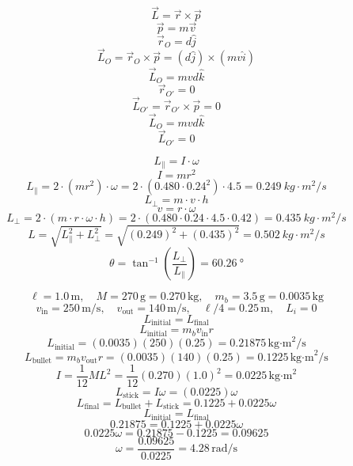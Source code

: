\documentclass[11pt]{homework}
\begin{document}
\setcounter{questionCounter}{35}
\question
\[
\vec{L} = \vec{r} \times \vec{p}
\]
\[
\vec{p} = m \vec{v}
\]
\[
\vec{r}_O = d \hat{j}
\]
\[
\vec{L}_O = \vec{r}_O \times \vec{p} = (d \hat{j}) \times (m v \hat{i})
\]
\[
\boxed{\vec{L}_O = m v d \hat{k}}
\]
\[
\vec{r}_{O'} = 0
\]
\[
\vec{L}_{O'} = \vec{r}_{O'} \times \vec{p} = 0
\]
\[
\vec{L}_O = m v d \hat{k}
\]
\[
    \boxed{\vec{L}_{O'} = 0}
\]


\setcounter{questionCounter}{41}
\question
\begin{alphaparts}
\questionpart

\[
L_{\parallel} = I \cdot \omega
\]
\[
I = m r^2
\]
\[
L_{\parallel} = 2 \cdot (m r^2) \cdot \omega = 2 \cdot (0.480 \cdot 0.24^2) \cdot 4.5 = \qty{0.249}{kg \cdot m^2 /s}
\]
\[
L_{\perp} = m \cdot v \cdot h
\]
\[
v = r \cdot \omega
\]
\[
    L_{\perp} = 2 \cdot (m \cdot r \cdot \omega \cdot h) = 2 \cdot (0.480 \cdot 0.24 \cdot 4.5 \cdot 0.42) = \qty{0.435}{kg \cdot m^2 /s}
\]
\[
    L = \sqrt{L_{\parallel}^2 + L_{\perp}^2} = \sqrt{(0.249)^2 + (0.435)^2} = \boxed{\qty{0.502}{kg \cdot m^2 /s}}
\]
\questionpart
\[
\theta = \tan^{-1} \left( \frac{L_{\perp}}{L_{\parallel}} \right) = \boxed{\qty{60.26}{\degree}}
\]
\end{alphaparts}


\setcounter{questionCounter}{47}
\question
\[\ell = 1.0 \, \text{m}, \quad
M = 270 \, \text{g} = 0.270 \, \text{kg}, \quad
m_b = 3.5 \, \text{g} = 0.0035 \, \text{kg}
\]\[
v_{\text{in}}=250 \, \text{m/s}, \quad
v_{\text{out}} = 140 \, \text{m/s}, \quad
\ell/4 = 0.25 \, \text{m}, \quad
L_i = 0
\]
\[
L_{\text{initial}} = L_{\text{final}}
\]
\[
L_{\text{initial}} = m_b v_{\text{in}} r
\]
\[
L_{\text{initial}} = (0.0035)(250)(0.25) = 0.21875 \, \text{kg·m}^2/\text{s}
\]
\[
L_{\text{bullet}} = m_b v_{\text{out}} r = (0.0035)(140)(0.25) = 0.1225 \, \text{kg·m}^2/\text{s}
\]
\[
I = \frac{1}{12} M L^2 = \frac{1}{12} (0.270)(1.0)^2 = 0.0225 \, \text{kg·m}^2
\]
\[
L_{\text{stick}} = I \omega = (0.0225) \omega
\]
\[
L_{\text{final}} = L_{\text{bullet}} + L_{\text{stick}} = 0.1225 + 0.0225\omega
\]
\[
L_{\text{initial}} = L_{\text{final}}
\]
\[
0.21875 = 0.1225 + 0.0225 \omega
\]
\[
0.0225 \omega = 0.21875 - 0.1225 = 0.09625
\]
\[
    \omega = \frac{0.09625}{0.0225} = \boxed{ 4.28 \, \text{rad/s}}
\]
\end{document}
